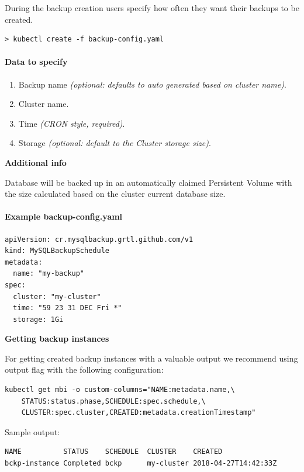 During the backup creation users specify how often they want their backups 
to be created.

\begin{lstlisting}
> kubectl create -f backup-config.yaml
\end{lstlisting}

\paragraph{Data to specify}
\begin{enumerate}
	\item Backup name \textit{(optional: defaults to auto generated based on cluster name)}.
	\item Cluster name.
	\item Time \textit{(CRON style, required)}.
	\item Storage \textit{(optional: default to the Cluster storage size)}.
\end{enumerate}

\noindent  \textbf{Additional info}

\noindent Database will be backed up in an automatically claimed Persistent Volume with the size
calculated based on the cluster current database size.

\paragraph{Example \textbf{backup-config.yaml}}
\begin{lstlisting}[caption=backup-config.yaml,captionpos=b]
apiVersion: cr.mysqlbackup.grtl.github.com/v1
kind: MySQLBackupSchedule
metadata:
  name: "my-backup"
spec:
  cluster: "my-cluster"
  time: "59 23 31 DEC Fri *"
  storage: 1Gi
\end{lstlisting}

\noindent  \textbf{Getting backup instances}

\noindent For getting created backup instances with a valuable output we recommend
using output flag with the following configuration:

\begin{lstlisting}
kubectl get mbi -o custom-columns="NAME:metadata.name,\
	STATUS:status.phase,SCHEDULE:spec.schedule,\
	CLUSTER:spec.cluster,CREATED:metadata.creationTimestamp"
\end{lstlisting}

\noindent Sample output:
\begin{lstlisting}
NAME          STATUS    SCHEDULE  CLUSTER    CREATED
bckp-instance Completed bckp      my-cluster 2018-04-27T14:42:33Z
\end{lstlisting}

